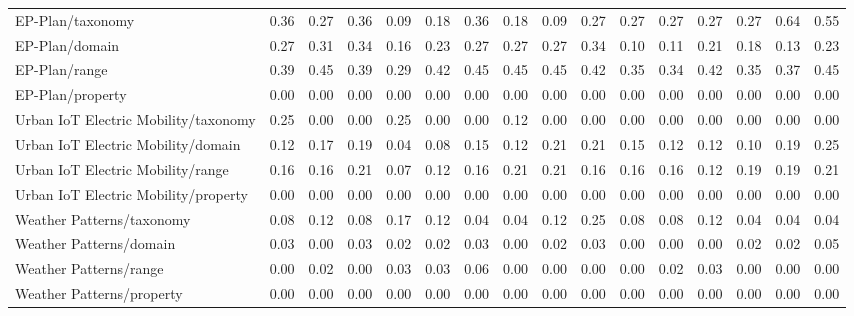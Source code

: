 \begin{tabular}{lccccccccccccccc}
EP-Plan/taxonomy & 0.36 & 0.27 & 0.36 & 0.09 & 0.18 & 0.36 & 0.18 & 0.09 & 0.27 & 0.27 & 0.27 & 0.27 & 0.27 & 0.64 & 0.55 \\
EP-Plan/domain & 0.27 & 0.31 & 0.34 & 0.16 & 0.23 & 0.27 & 0.27 & 0.27 & 0.34 & 0.10 & 0.11 & 0.21 & 0.18 & 0.13 & 0.23 \\
EP-Plan/range & 0.39 & 0.45 & 0.39 & 0.29 & 0.42 & 0.45 & 0.45 & 0.45 & 0.42 & 0.35 & 0.34 & 0.42 & 0.35 & 0.37 & 0.45 \\
EP-Plan/property & 0.00 & 0.00 & 0.00 & 0.00 & 0.00 & 0.00 & 0.00 & 0.00 & 0.00 & 0.00 & 0.00 & 0.00 & 0.00 & 0.00 & 0.00 \\
Urban IoT Electric Mobility/taxonomy & 0.25 & 0.00 & 0.00 & 0.25 & 0.00 & 0.00 & 0.12 & 0.00 & 0.00 & 0.00 & 0.00 & 0.00 & 0.00 & 0.00 & 0.00 \\
Urban IoT Electric Mobility/domain & 0.12 & 0.17 & 0.19 & 0.04 & 0.08 & 0.15 & 0.12 & 0.21 & 0.21 & 0.15 & 0.12 & 0.12 & 0.10 & 0.19 & 0.25 \\
Urban IoT Electric Mobility/range & 0.16 & 0.16 & 0.21 & 0.07 & 0.12 & 0.16 & 0.21 & 0.21 & 0.16 & 0.16 & 0.16 & 0.12 & 0.19 & 0.19 & 0.21 \\
Urban IoT Electric Mobility/property & 0.00 & 0.00 & 0.00 & 0.00 & 0.00 & 0.00 & 0.00 & 0.00 & 0.00 & 0.00 & 0.00 & 0.00 & 0.00 & 0.00 & 0.00 \\
Weather Patterns/taxonomy & 0.08 & 0.12 & 0.08 & 0.17 & 0.12 & 0.04 & 0.04 & 0.12 & 0.25 & 0.08 & 0.08 & 0.12 & 0.04 & 0.04 & 0.04 \\
Weather Patterns/domain & 0.03 & 0.00 & 0.03 & 0.02 & 0.02 & 0.03 & 0.00 & 0.02 & 0.03 & 0.00 & 0.00 & 0.00 & 0.02 & 0.02 & 0.05 \\
Weather Patterns/range & 0.00 & 0.02 & 0.00 & 0.03 & 0.03 & 0.06 & 0.00 & 0.00 & 0.00 & 0.00 & 0.02 & 0.03 & 0.00 & 0.00 & 0.00 \\
Weather Patterns/property & 0.00 & 0.00 & 0.00 & 0.00 & 0.00 & 0.00 & 0.00 & 0.00 & 0.00 & 0.00 & 0.00 & 0.00 & 0.00 & 0.00 & 0.00 \\
\bottomrule
\end{tabular}
